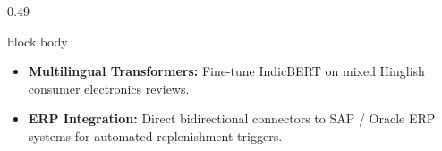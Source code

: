\documentclass[aspectratio=169, 10pt]{beamer}
\newenvironment{card}[1][]{%
        \begin{beamercolorbox}[rounded=true,shadow=false,wd=\linewidth,sep=3.5pt,#1]{block body}%
        \fontsize{7.8pt}{9.8pt}\selectfont%
    }{%
        \end{beamercolorbox}%
    }
\begin{document}
\begin{frame}[t]
\begin{columns}[T]
\begin{column}{0.49\textwidth}
\begin{card}
                    \begin{itemize}\setlength{\itemsep}{2pt}                                                                                                                                           
                        \item \textbf{Multilingual Transformers:} Fine-tune IndicBERT on mixed Hinglish consumer electronics reviews.                                                                  
                        \item \textbf{ERP Integration:} Direct bidirectional connectors to SAP / Oracle ERP systems for automated replenishment triggers.                                              
                    \end{itemize}                                                                                                                                                                      
                \end{card}                                                                                                                                                                             
            \end{column}                                                                                                                                                                               
        \end{columns}                                                                                                                                                                                  
    \end{frame}                                                                                                                                                                                        
                                                                                                                                                                                                       
    
\end{document}
